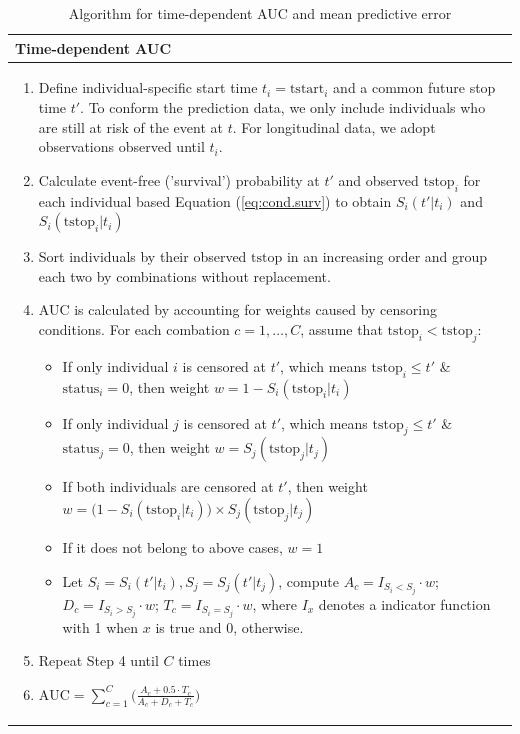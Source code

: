 \begin{table}[H]
\centering \small
\caption{Algorithm for time-dependent AUC and mean predictive error} \label{tab:chp3_auc}
\begin{tabular}{p{14cm}} 
 \toprule
 \textbf{Time-dependent AUC}\\
 \midrule
  \begin{enumerate}
      \item Define individual-specific start time $t_i=\mbox{tstart}_i$ and a common future stop time $t'$. To conform the prediction data, we only include individuals who are still at risk of the event at $t$. For longitudinal data, we adopt observations observed until $t_i$. 
      \item Calculate event-free ('survival') probability at $t'$ and observed $\mbox{tstop}_i$ for each individual based Equation (\ref{eq:cond.surv}) to obtain $S_i(t'|t_i)$ and $S_i(\mbox{tstop}_i|t_i)$
      \item Sort individuals by their observed $\mbox{tstop}$ in an increasing order and group each two by combinations without replacement. 
      \item AUC is calculated by accounting for weights caused by censoring conditions. For each combation $c=1,\dots,C$, assume that $\mbox{tstop}_i < \mbox{tstop}_j$:
        \begin{itemize}
            \footnotesize
            \item If only individual $i$ is censored at $t'$, which means $\mbox{tstop}_i \leq t'$ \& $\mbox{status}_i=0$, then weight $w=1-S_i(\mbox{tstop}_i|t_i)$
            \item If only individual $j$ is censored at $t'$, which means $\mbox{tstop}_j \leq t'$ \& $\mbox{status}_j=0$, then weight $w=S_j(\mbox{tstop}_j|t_j)$
            \item If both individuals are censored at $t'$, then weight $w=\big(1-S_i(\mbox{tstop}_i|t_i)\big) \times S_j(\mbox{tstop}_j|t_j)$
            \item If it does not belong to above cases, $w=1$
            \item Let $S_i=S_i(t'|t_i), S_j=S_j(t'|t_j)$, compute $A_c=I_{S_i<S_j} \cdot w$; $D_c=I_{S_i>S_j} \cdot w$; $T_c=I_{S_i=S_j} \cdot w$, where $I_x$ denotes a indicator function with 1 when $x$ is true and 0, otherwise. 
        \end{itemize}
      \item Repeat Step 4 until $C$ times
      \item $\mbox{AUC}=\sum_{c=1}^C \big(\frac{A_c+0.5 \cdot T_c}{A_c + D_c + T_c}\big)$

\end{enumerate}
\end{tabular}
\end{table}
